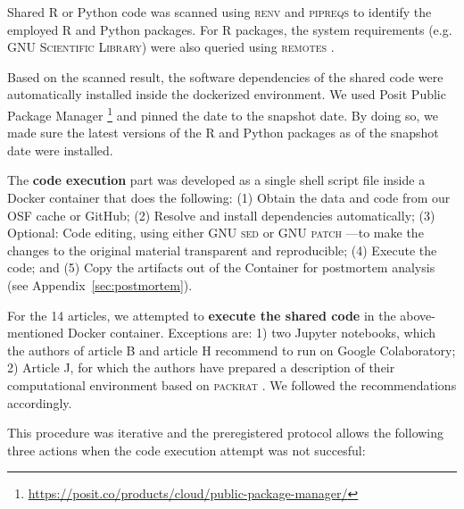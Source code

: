 Shared R or Python code was scanned using \textsc{renv} \parencite[]{renv} and \textsc{pipreqs} \parencite[]{pipreqs} to identify the employed R and Python packages. For R packages, the system requirements (e.g. \textsc{GNU Scientific Library}) were also queried using \textsc{remotes} \parencite[]{remotes}.

Based on the scanned result, the software dependencies of the shared code were automatically installed inside the dockerized environment. We used Posit Public Package Manager \footnote{\url{https://posit.co/products/cloud/public-package-manager/}} and pinned the date to the snapshot date. By doing so, we made sure the latest versions of the R and Python packages as of the snapshot date were installed.


The \textbf{code execution} part was developed as a single shell script file inside a Docker container that does the following: (1) Obtain the data and code from our OSF cache or GitHub; (2) Resolve and install dependencies automatically; (3) Optional: Code editing, using either \textsc{GNU sed} \parencite[]{pizzini2018gnu} or \textsc{GNU patch} \parencite[]{gnupatch}---to make the changes to the original material transparent and reproducible; (4) Execute the code; and (5) Copy the artifacts out of the Container for postmortem analysis (see Appendix~\ref{sec:postmortem}).


For the 14 articles, we attempted to \textbf{execute the shared code} in the above-mentioned Docker container. Exceptions are: 1) two Jupyter notebooks, which the authors of article B and article H recommend to run on Google Colaboratory; 2) Article J, for which the authors have prepared a description of their computational environment based on \textsc{packrat} \parencite[]{packrat}. We followed the recommendations accordingly.

This procedure was iterative and the preregistered protocol allows the following three actions when the code execution attempt was not succesful:

